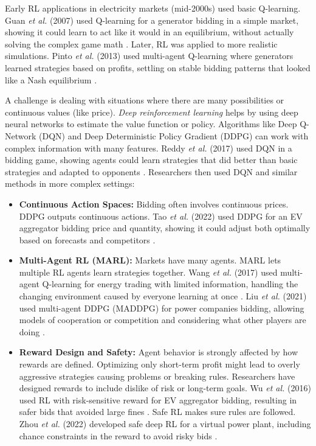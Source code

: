 \documentclass[conference]{IEEEtran}
\begin{document}
Early RL applications in electricity markets (mid-2000s) used basic Q-learning. Guan \textit{et al.} (2007) used Q-learning for a generator bidding in a simple market, showing it could learn to act like it would in an equilibrium, without actually solving the complex game math \cite{Guan2007}. Later, RL was applied to more realistic simulations. Pinto \textit{et al.} (2013) used multi-agent Q-learning where generators learned strategies based on profits, settling on stable bidding patterns that looked like a Nash equilibrium \cite{Pinto2013}.

A challenge is dealing with situations where there are many possibilities or continuous values (like price). \textit{Deep reinforcement learning} helps by using deep neural networks to estimate the value function or policy. Algorithms like Deep Q-Network (DQN) \cite{Mnih2015} and Deep Deterministic Policy Gradient (DDPG) \cite{Lillicrap2015} can work with complex information with many features. Reddy \textit{et al.} (2017) used DQN in a bidding game, showing agents could learn strategies that did better than basic strategies and adapted to opponents \cite{Reddy2017}. Researchers then used DQN and similar methods in more complex settings:
\begin{itemize}
    \item \textbf{Continuous Action Spaces:} Bidding often involves continuous prices. DDPG outputs continuous actions. Tao \textit{et al.} (2022) used DDPG for an EV aggregator bidding price and quantity, showing it could adjust both optimally based on forecasts and competitors \cite{Tao2022}.
    \item \textbf{Multi-Agent RL (MARL):} Markets have many agents. MARL lets multiple RL agents learn strategies together. Wang \textit{et al.} (2017) used multi-agent Q-learning for energy trading with limited information, handling the changing environment caused by everyone learning at once \cite{Wang2017}. Liu \textit{et al.} (2021) used multi-agent DDPG (MADDPG) for power companies bidding, allowing models of cooperation or competition and considering what other players are doing \cite{Liu2021}.
    \item \textbf{Reward Design and Safety:} Agent behavior is strongly affected by how rewards are defined. Optimizing only short-term profit might lead to overly aggressive strategies causing problems or breaking rules. Researchers have designed rewards to include dislike of risk or long-term goals. Wu \textit{et al.} (2016) used RL with risk-sensitive reward for EV aggregator bidding, resulting in safer bids that avoided large fines \cite{Wu2016}. Safe RL makes sure rules are followed. Zhou \textit{et al.} (2022) developed safe deep RL for a virtual power plant, including chance constraints in the reward to avoid risky bids \cite{Zhou2022}.
\end{itemize}
\end{document}
